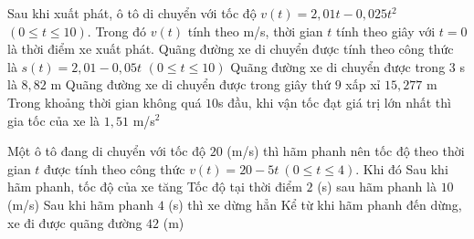 \begin{ex}%
	Sau khi xuất phát, ô tô di chuyển với tốc độ $v(t)=2{,}01t-0{,}025t^2$ $(0 \le t \le 10)$. Trong đó $v(t)$ tính  theo m/s, thời gian $t$ tính theo giây với $t=0$ là thời điểm xe xuất phát.
	\choiceTF 
		 {Quãng đường xe di chuyển được tính theo công thức là $s(t)=2{,}01-0{,}05t$ $(0 \le t \le 10)$}
		{\True Quãng đường xe di chuyển được trong  $3$ s là $8{,}82$ m}
		{\True Quãng đường xe  di chuyển được trong giây thứ $9$ xấp xỉ $15{,}277$ m}
		 {\True Trong khoảng thời gian không quá $10$s đầu, khi vận tốc đạt giá trị lớn nhất thì gia tốc của xe là $1{,}51$ m/s$^2$}
\end{ex}

\begin{ex}%
	Một ô tô đang di chuyển với  tốc độ $20$ (m/s) thì hãm phanh nên tốc độ theo thời gian $t$ được tính theo công thức $v(t)=20-5t~\left( 0\le t\le 4 \right)$. Khi đó
	\choiceTF 
		 {Sau khi hãm phanh, tốc độ của xe tăng}
		{\True Tốc độ tại thời  điểm $2$ (s) sau hãm phanh là $10$ (m/s)}
		{\True Sau khi hãm phanh  $4$ (s) thì xe dừng hẳn}
		{Kể từ khi hãm phanh đến dừng, xe đi được quãng đường $42$  (m)}
\end{ex}

